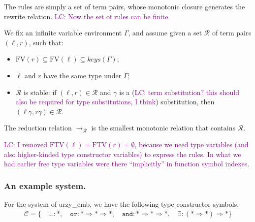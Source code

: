 \documentclass[runningheads,a4paper]{llncs}
\newcommand{\Rules}{\mathcal{R}}
\newcommand{\TypeConstructors}{\mathcal{C}}
\newcommand{\arr}[1]{\longrightarrow_{#1}}
\newcommand{\arrkind}{\Rightarrow}
\newcommand{\FTV}{\mathrm{FTV}}
\newcommand{\FV}{\mathrm{FV}}
\newcommand{\LC}[1]{\textcolor{purple}{LC: #1}}
\begin{document}
The rules are simply a set of term pairs, whose monotonic closure
generates the rewrite relation. \LC{Now the set of rules can be
  finite.}

\begin{definition}\normalfont
We fix an infinite variable environment $\Gamma$,
and assume given a set $\Rules$ of term pairs $(\ell,r)$, such that:
\begin{itemize}
\item $\FV(r) \subseteq \FV(\ell) \subseteq \mathit{keys}(\Gamma)$;
\item $\ell$ and $r$ have the same type under $\Gamma$;
\item $\Rules$ is stable: if $(\ell,r) \in \Rules$ and $\gamma$ is a
  (\LC{term substitution? this should also be required for type
  substitutions, I think}) substitution, then $(\ell\gamma,r\gamma)
  \in \Rules$.
\end{itemize}
The reduction relation $\arr{\Rules}$ is the smallest monotonic
relation that contains $\Rules$.
\end{definition}

\LC{I removed $\FTV(\ell) = \FTV(r) = \emptyset$, because we need type
  variables (and also higher-kinded type constructor variables) to
  express the rules. In what we had earlier free type variables were
  there ``implicitly'' in function symbol indexes.}

\subsubsection{An example system.}

For the system of urzy\_emb, we have the following type constructor
symbols:
\[
\begin{array}{c}
\TypeConstructors = \{\quad
  \bot : *,\quad
  \mathtt{or} : * \arrkind * \arrkind *,\quad
  \mathtt{and} : * \arrkind * \arrkind *,\quad
  \exists : (* \arrkind *) \arrkind *
  \}
\end{array}
\]
\end{document}
